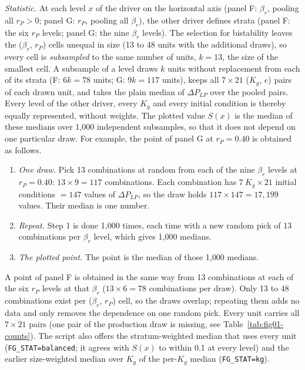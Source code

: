 \documentclass[11pt]{article}
\newcommand{\bros}{\beta_r}
\begin{document}
\emph{Statistic.} At each level $x$ of the driver on the horizontal axis (panel F:
$\beta_r$, pooling all $r_P > 0$; panel G: $r_P$, pooling all $\beta_r$), the
other driver defines strata (panel F: the six $r_P$ levels; panel G: the nine
$\beta_r$ levels). The selection for bistability leaves the ($\beta_r$, $r_P$) cells
unequal in size (13 to 48 units with the additional draws), so every cell is
\emph{subsampled} to the same number of units, $k = 13$, the size of the smallest cell.
A subsample of a level draws $k$ units without replacement from each of its strata
(F: $6k = 78$ units; G: $9k = 117$ units), keeps all $7\times21$ ($K_g$, $e$) pairs of
each drawn unit, and takes the plain median of $\Delta P_{LP}$ over the pooled pairs.
Every level of the other driver, every $K_g$ and every initial condition is thereby
equally represented, without weights. The plotted value $S(x)$ is the median of these
medians over 1{,}000 independent subsamples, so that it does not depend on one
particular draw. For example, the point of panel G at $r_P = 0.40$ is obtained as follows.
\begin{enumerate}
\item \emph{One draw.} Pick 13 combinations at random from each of the nine $\bros$
  levels at $r_P = 0.40$: $13 \times 9 = 117$ combinations. Each combination has
  $7\ K_g \times 21$ initial conditions $= 147$ values of $\Delta P_{LP}$, so the draw
  holds $117 \times 147 = 17{,}199$ values. Their median is one number.
\item \emph{Repeat.} Step 1 is done 1{,}000 times, each time with a new random pick of
  13 combinations per $\bros$ level, which gives 1{,}000 medians.
\item \emph{The plotted point.} The point is the median of those 1{,}000 medians.
\end{enumerate}
A point of panel F is obtained in the same way from 13 combinations at each of the six
$r_P$ levels at that $\bros$ ($13 \times 6 = 78$ combinations per draw). Only 13 to 48
combinations exist per ($\bros$, $r_P$) cell, so the draws overlap; repeating them
adds no data and only removes the dependence on one random pick. Every unit carries all $7\times21$ pairs (one pair of the production
draw is missing, see Table~\ref{tab:fig01-counts}). The script also offers the
stratum-weighted median that uses every unit (\texttt{FG\_STAT=balanced}; it agrees with
$S(x)$ to within 0.1 at every level) and the earlier size-weighted median over $K_g$ of
the per-$K_g$ median (\texttt{FG\_STAT=kg}).
\end{document}
